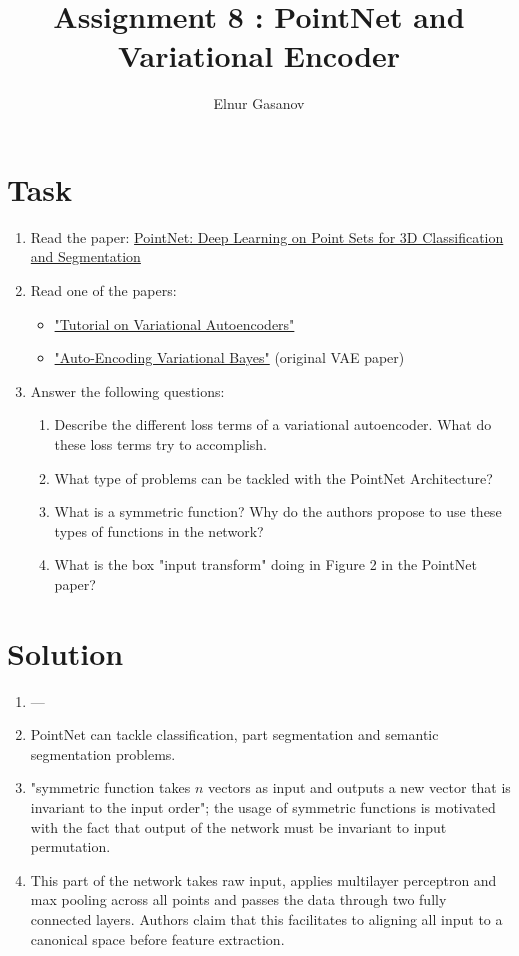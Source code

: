 \documentclass{article}
\author{Elnur Gasanov}
\date{}
\title{Assignment 8 : PointNet and Variational Encoder}
\begin{document}
\maketitle

\section{Task}
\begin{enumerate}
	\item Read the paper: \href{https://arxiv.org/abs/1612.00593}{PointNet: Deep Learning on Point Sets for 3D Classification and Segmentation}
	\item Read one of the papers: 
		\begin{itemize} \item \href{https://arxiv.org/abs/1606.05908}{"Tutorial on Variational Autoencoders"} \item \href{https://arxiv.org/abs/1312.6114}{"Auto-Encoding Variational Bayes"} (original VAE paper) \end{itemize}
	\item Answer the following questions:
		\begin{enumerate}
			\item Describe the different loss terms of a variational autoencoder. What do these loss terms try to accomplish.
			\item What type of problems can be tackled with the PointNet Architecture?
			\item What is a symmetric function? Why do the authors propose to use these types of functions in the network?
			\item What is the box "input transform" doing in Figure 2 in the PointNet paper?
		\end{enumerate}
\end{enumerate}

\section{Solution}

\begin{enumerate}[label=(\alph*)]
	\item ---
	\item PointNet can tackle classification, part segmentation and semantic segmentation problems.
	\item "symmetric function takes $n$ vectors as input and outputs a new vector that is invariant to the input order"; the usage of symmetric functions is motivated with the fact that output of the network must be invariant to input permutation.
	\item This part of the network takes raw input, applies multilayer perceptron and max pooling across all points and passes the data through two fully connected layers. Authors claim that this facilitates to aligning all input to a canonical space before feature extraction.
\end{enumerate}
\end{document}
